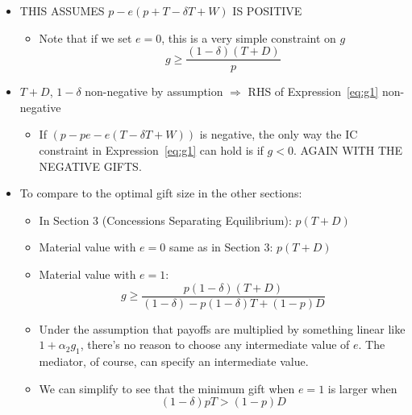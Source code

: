 \documentclass[12pt]{article}
\newcommand{\al}{\alpha}
\newcommand{\de}{\delta}
\begin{document}
						\begin{itemize}
							\item THIS ASSUMES {\color{red} $p - e \left( p + T - \de T + W \right)$ IS POSITIVE}
								\begin{itemize}
									\item Note that if we set $e=0$, this is a very simple constraint on $g$
										\begin{equation}
											g \geq \frac{\left(1 - \de \right) \left( T + D \right)}{p}
											\label{eq:g3}
										\end{equation}
								\end{itemize}
							\item $T+D$, $1 - \de $ non-negative by assumption $\Rightarrow$ RHS of Expression~\ref{eq:g1} non-negative
								\begin{itemize}
									\item If $\left(p - pe - e \left( T - \de T + W \right) \right)$ is negative, the only way the IC constraint in Expression~\ref{eq:g1} can hold is if $g<0$. AGAIN WITH THE NEGATIVE GIFTS.
								\end{itemize}
							\item To compare to the optimal gift size in the other sections:
								\begin{itemize}
									\item In Section 3 (Concessions Separating Equilibrium): $p\left(T+D\right)$
									\item Material value with $e=0$ same as in Section 3: $p\left(T+D\right)$
									\item Material value with $e=1$:
										\begin{equation}
											g \geq \frac{p(1-\de)(T + D)}{\left(1-\de \right) -p(1-\de)T +(1-p)D}
											\label{eq:g4}
										\end{equation}
									\item Under the assumption that payoffs are multiplied by something linear like $1 + \al_2 g_1$, there's no reason to choose any intermediate value of $e$. The mediator, of course, can specify an intermediate value.
									\item We can simplify to see that the minimum gift when $e=1$ is larger when
										\[
											(1-\de)pT > (1-p)D
										\]
								\end{itemize}
						\end{itemize}
				
\end{document}
